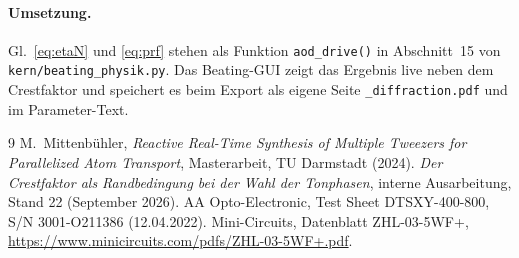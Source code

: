 \documentclass[11pt,a4paper]{article}
\begin{document}
{\sloppy\paragraph{Umsetzung.} Gl.~\eqref{eq:etaN} und \eqref{eq:prf} stehen als Funktion
\texttt{aod\_drive()} in Abschnitt~15 von \texttt{kern/\allowbreak beating\_physik.py}. Das
Beating-GUI zeigt das Ergebnis live neben dem Crestfaktor und speichert es beim
Export als eigene Seite \texttt{\_diffraction.pdf} und im Parameter-Text.\par}

\begin{thebibliography}{9}
 M.~Mittenbühler, \emph{Reactive Real-Time Synthesis of
  Multiple Tweezers for Parallelized Atom Transport}, Masterarbeit, TU Darmstadt
  (2024).
 \emph{Der Crestfaktor als Randbedingung bei der Wahl der Tonphasen}, interne
  Ausarbeitung, Stand 22 (September 2026).
 AA Opto-Electronic, Test Sheet DTSXY-400-800, S/N
  3001-O211386 (12.04.2022).
 Mini-Circuits, Datenblatt ZHL-03-5WF+,
  \url{https://www.minicircuits.com/pdfs/ZHL-03-5WF+.pdf}.
\end{thebibliography}
\end{document}
